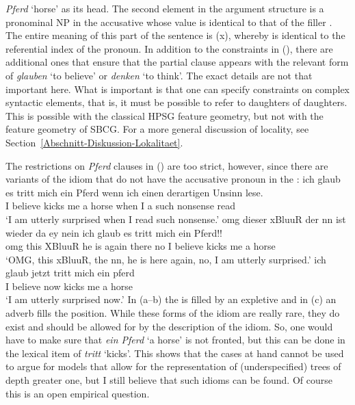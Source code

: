   \emph{Pferd} `horse' as its head. The second element in the argument structure is a pronominal NP in the accusative whose \local value
  is identical to that of the filler . The entire meaning of this part of the sentence is (x),
  whereby  is identical to the referential index of the pronoun.
 In addition to the constraints in (), there are additional ones that ensure that the partial clause appears with the relevant
 form of \emph{glauben} `to believe' or \emph{denken} `to think'. The exact details are not that important here. What is important is that one can specify constraints
 on complex syntactic elements, that is, it must be possible to refer to daughters of
 daughters. This is possible with the classical HPSG feature geometry, but not with the feature
 geometry of SBCG. For a more general discussion of locality, see
 Section~\ref{Abschnitt-Diskussion-Lokalitaet}. 

\largerpage[2]
The restrictions on \emph{Pferd} clauses in () are too strict, however, since there are
variants of the idiom that do not have the accusative pronoun in the \vf:
\eal
\ex 
\gll ich glaub es tritt mich ein Pferd wenn ich einen derartigen Unsinn lese.\footnotemark\\
     I believe \expl{} kicks me a horse when I a such nonsense read\\
\glt `I am utterly surprised when I read such nonsense.'
\ex 
\gll omg dieser xBluuR der nn ist wieder da ey nein ich glaub es tritt mich ein Pferd!!\footnotemark\\
    omg this   XBluuR he  {} is  again there {} no I believe \expl{} kicks me a horse\\
\glt `OMG, this xBluuR, the nn, he is here again, no, I am utterly surprised.'
\ex 
\gll ich glaub jetzt tritt mich ein pferd\footnotemark\\
    I believe now   kicks me a horse\\
\glt `I am utterly surprised now.'
\zl
In (a--b) the \vf is filled by an expletive and in (c) an adverb fills the \vf position.
While these forms of the idiom are really rare, they do exist and should be allowed for by the
description of the idiom. So, one would have to make sure that \emph{ein Pferd} `a horse' is not
fronted, but this can be done in the lexical item of \emph{tritt} `kicks'. This shows that the cases
at hand cannot be used to argue for models that allow for the representation of (underspecified)
trees of depth greater one, but I still believe that such idioms can be found. Of course this is an
open empirical question. 

